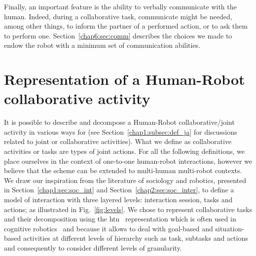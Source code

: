 \documentclass[a4paper,11pt,twoside]{StyleThese}
\begin{document}
Finally, an important feature is the ability to verbally communicate with the human. Indeed, during a collaborative task, communicate might be needed, among other things, to inform the partner of a performed action, or to ask them to perform one. Section~\ref{chap6:sec:comm} describes the choices we made to endow the robot with a minimum set of communication abilities.





\section{Representation of a Human-Robot collaborative activity}\label{chap5:sec:levels}
It is possible to describe and decompose a Human-Robot collaborative/joint activity in various ways for (see Section~\ref{chap1:subsec:def_ja} for discussions related to joint or collaborative activities). What we define as collaborative activities or tasks are types of joint actions. For all the following definitions, we place ourselves in the context of one-to-one human-robot interactions, however we  believe that the scheme can be extended to multi-human multi-robot contexts. 
We draw our inspiration from the literature of sociology and robotics, presented in Section~\ref{chap1:sec:soc_int} and Section~\ref{chap2:sec:soc_inter}, to define a model of interaction with three layered levels: interaction session, tasks and actions; as illustrated in Fig.~\ref{fig:levels}. We chose to represent collaborative tasks and their decomposition using the \acrfull{htn}~\cite{ghallab_2016_automated} representation which is often used in cognitive robotics~\cite{ingrand-2017,lallement_2014_hatp, buisan_2021_human} and because it allows to deal with goal-based and situation-based activities at different levels of hierarchy such as task, subtasks and actions and consequently to consider different levels of granularity. 
\end{document}
